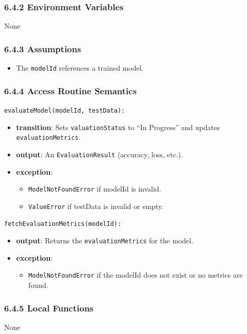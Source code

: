 \documentclass[12pt, titlepage]{article}
\begin{document}
\subsubsection{6.4.2 Environment Variables}
None

\subsubsection{6.4.3 Assumptions}
\begin{itemize}
    \item The \texttt{modelId} references a trained model.
\end{itemize}

\subsubsection{6.4.4 Access Routine Semantics}
\noindent \texttt{evaluateModel(modelId, testData):}
\begin{itemize}
    \item \textbf{transition}: Sets \texttt{valuationStatus} to ``In Progress'' and updates \texttt{evaluationMetrics}.
    \item \textbf{output}: An \texttt{EvaluationResult} (accuracy, loss, etc.).
    \item \textbf{exception}:
    \begin{itemize}
        \item \texttt{ModelNotFoundError} if modelId is invalid.
        \item \texttt{ValueError} if testData is invalid or empty.
    \end{itemize}
\end{itemize}

\noindent \texttt{fetchEvaluationMetrics(modelId):}
\begin{itemize}
    \item \textbf{output}: Returns the \texttt{evaluationMetrics} for the model.
    \item \textbf{exception}:
    \begin{itemize}
        \item \texttt{ModelNotFoundError} if the modelId does not exist or no metrics are found.
    \end{itemize}
\end{itemize}

\subsubsection{6.4.5 Local Functions}
None
\end{document}
